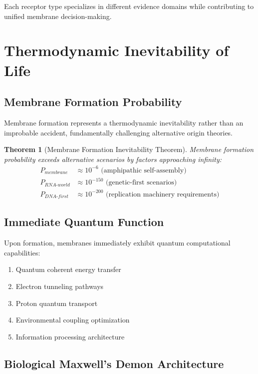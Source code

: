 \documentclass[12pt,a4paper]{article}
\newtheorem{theorem}{Theorem}
\begin{document}
Each receptor type specializes in different evidence domains while contributing to unified membrane decision-making.

\section{Thermodynamic Inevitability of Life}

\subsection{Membrane Formation Probability}

Membrane formation represents a thermodynamic inevitability rather than an improbable accident, fundamentally challenging alternative origin theories.

\begin{theorem}[Membrane Formation Inevitability Theorem]
Membrane formation probability exceeds alternative scenarios by factors approaching infinity:
\begin{align}
P_{membrane} &\approx 10^{-6} \text{ (amphipathic self-assembly)} \\
P_{RNA\text{-}world} &\approx 10^{-150} \text{ (genetic-first scenarios)} \\
P_{DNA\text{-}first} &\approx 10^{-200} \text{ (replication machinery requirements)}
\end{align}
\end{theorem}

\subsection{Immediate Quantum Function}

Upon formation, membranes immediately exhibit quantum computational capabilities:

\begin{enumerate}
\item Quantum coherent energy transfer
\item Electron tunneling pathways  
\item Proton quantum transport
\item Environmental coupling optimization
\item Information processing architecture
\end{enumerate}

\subsection{Biological Maxwell's Demon Architecture}
\end{document}
